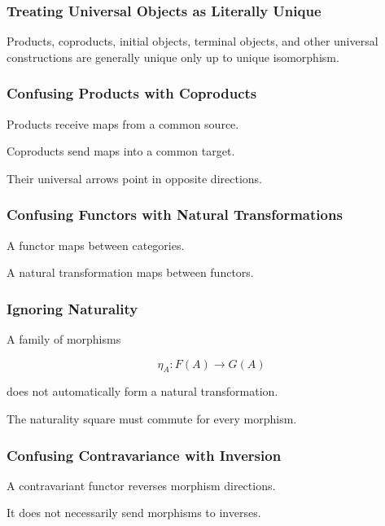 \subsubsection{Treating Universal Objects as Literally Unique}

Products, coproducts, initial objects, terminal objects, and other universal
constructions are generally unique only up to unique isomorphism.

\subsubsection{Confusing Products with Coproducts}

Products receive maps from a common source.

Coproducts send maps into a common target.

Their universal arrows point in opposite directions.

\subsubsection{Confusing Functors with Natural Transformations}

A functor maps between categories.

A natural transformation maps between functors.

\subsubsection{Ignoring Naturality}

A family of morphisms

\[ \eta_A:F(A)\to G(A) \]

does not automatically form a natural transformation.

The naturality square must commute for every morphism.

\subsubsection{Confusing Contravariance with Inversion}

A contravariant functor reverses morphism directions.

It does not necessarily send morphisms to inverses.

